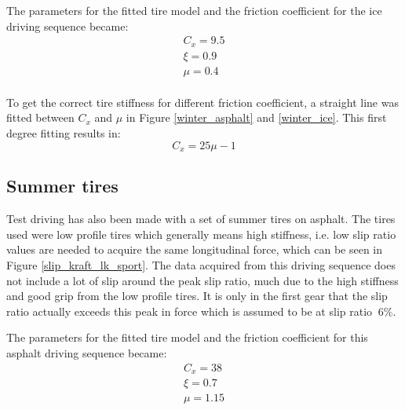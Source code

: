 The parameters for the fitted tire model and the friction coefficient for the ice driving sequence became:
\begin{equation}
\label{winter_ice}
\begin{split}
C_{x} = 9.5 \\
\xi = 0.9 \\
\mu = 0.4 \\
\end{split}
\end{equation}

To get the correct tire stiffness for different friction coefficient, a straight line was fitted between $ C_{x} $ and $ \mu $ in Figure \ref{winter_asphalt} and \ref{winter_ice}. This first degree fitting results in:
\begin{equation}
	C_{x} = 25\mu - 1
\end{equation}

\subsection{Summer tires}
\label{summer_tire}
Test driving has also been made with a set of summer tires on asphalt. The tires used were low profile tires which generally means high stiffness, i.e. low slip ratio values are needed to acquire the same longitudinal force, which can be seen in Figure \ref{slip_kraft_lk_sport}. The data acquired from this driving sequence does not include a lot of slip around the peak slip ratio, much due to the high stiffness and good grip from the low profile tires. It is only in the first gear that the slip ratio actually exceeds this peak in force which is assumed to be at slip ratio $ ~ 6 \% $.

The parameters for the fitted tire model and the friction coefficient for this asphalt driving sequence became:
\begin{equation}
\label{summer_lk}
\begin{split}
C_{x} = 38 \\
\xi = 0.7 \\
\mu = 1.15 \\
\end{split}
\end{equation}

